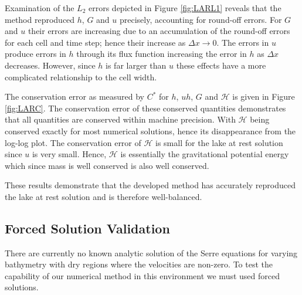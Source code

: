 \documentclass[times]{elsarticle}
\begin{document}
Examination of the $L_2$ errors depicted in Figure \ref{fig:LARL1} reveals that the method reproduced $h$, $G$ and $u$ precisely, accounting for round-off errors. For $G$ and $u$ their errors are increasing due to an accumulation of the round-off errors for each cell and time step; hence their increase as $\Delta x \rightarrow 0$. The errors in $u$ produce errors in $h$ through its flux function increasing the error in $h$ as $\Delta x$ decreases. However, since $h$ is far larger than $u$ these effects have a more complicated relationship to the cell width.

The conservation error as measured by $C^*$  for $h$, $uh$, $G$ and $\mathcal{H}$ is given in Figure \ref{fig:LARC}. The conservation error of these conserved quantities demonstrates that all quantities are conserved within machine precision. With $\mathcal{H}$ being conserved exactly for most numerical solutions, hence its disappearance from the log-log plot. The conservation error of $\mathcal{H}$ is small for the lake at rest solution since $u$ is very small. Hence, $\mathcal{H}$ is essentially the gravitational potential energy which since mass is well conserved is also well conserved.

These results demonstrate that the developed method has accurately reproduced the lake at rest solution and is therefore well-balanced.

\subsection{Forced Solution Validation}
There are currently no known analytic solution of the Serre equations for varying bathymetry with dry regions where the velocities are non-zero. To test the capability of our numerical method in this environment we must used forced solutions.
\end{document}
